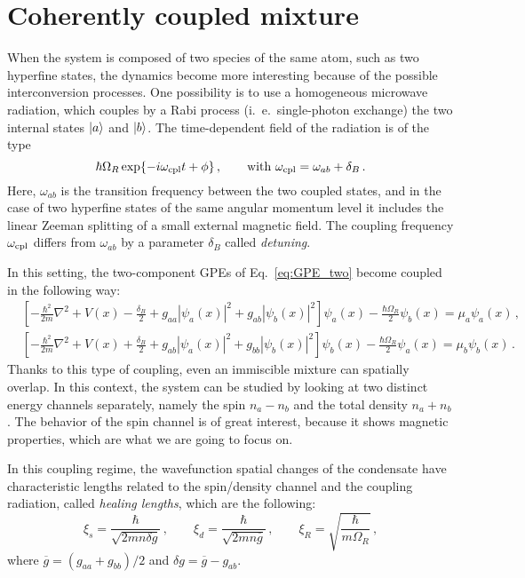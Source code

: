 \section{Coherently coupled mixture}
When the system is composed of two species of the same atom, such as two hyperfine states, the dynamics become more interesting because of the possible interconversion processes. One possibility is to use a homogeneous microwave radiation, which couples by a Rabi process (i.\ e.\ single-photon exchange) the two internal states $\ket{a}$ and $\ket{b}$. The time-dependent field of the radiation is of the type
\begin{equation*}
    \hbar\Omega_R \exp{-i\omega_{\rm cpl}t + \phi}\, ,\qquad \text{with }
    \omega_{\rm cpl} = \omega_{ab} + \delta_B\, .
\end{equation*}
Here, $\omega_{ab}$ is the transition frequency between the two coupled states, and in the case of two hyperfine states of the same angular momentum level it includes the linear Zeeman splitting of a small external magnetic field. The coupling frequency $\omega_{\rm cpl}$ differs from $\omega_{ab}$ by a parameter $\delta_B$ called \textit{detuning}.

In this setting, the two-component GPEs of Eq.\ \eqref{eq:GPE_two} become coupled in the following way:
\begin{equation}
    \begin{aligned}
        &\left[ -\frac{\hbar^2}{2m}\nabla^2 + V(x) - \frac{\delta_B}{2} + g_{aa}|\psi_a(x)|^2 + g_{ab}|\psi_b(x)|^2
        \right] \psi_a(x) - \frac{\hbar\Omega_R}{2}\psi_b(x) = \mu_a \psi_a(x)\, , \\
        &\left[ -\frac{\hbar^2}{2m}\nabla^2 + V(x) + \frac{\delta_B}{2} + g_{ab}|\psi_a(x)|^2 + g_{bb}|\psi_b(x)|^2
        \right] \psi_b(x) - \frac{\hbar\Omega_R}{2}\psi_a(x) = \mu_b \psi_b(x)\, .
    \end{aligned}
    \label{eq:GPE_coupled}
\end{equation}
Thanks to this type of coupling, even an immiscible mixture can spatially overlap. In this context, the system can be studied by looking at two distinct energy channels separately, namely the spin $n_a-n_b$ and the total density $n_a+n_b$. The behavior of the spin channel is of great interest, because it shows magnetic properties, which are what we are going to focus on. 

In this coupling regime, the wavefunction spatial changes of the condensate have characteristic lengths related to the spin/density channel and the coupling radiation, called \textit{healing lengths}, which are the following:
\begin{equation}
    \xi_s = \frac{\hbar}{\sqrt{2mn\delta g}}\, ,
    \qquad
    \xi_d = \frac{\hbar}{\sqrt{2mn\overline{g}}}\, ,
    \qquad
    \xi_R = \sqrt{\frac{\hbar}{m\Omega_R}}\, ,
    \label{eq:heal}
\end{equation} 
where $\overline{g} = (g_{aa}+g_{bb})/2$ and $\delta g = \overline{g} - g_{ab}$.

